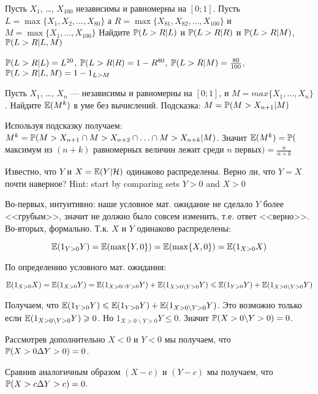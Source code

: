 \begin{problem}
Пусть $ X_{1} $, \ldots, $ X_{100} $ независимы и равномерны на $ [0;1] $. Пусть $ L=\max\{X_{1},X_{2},\ldots, X_{80}\} $ а $ R=\max\{X_{81},X_{82},\ldots,X_{100}\} $ и $ M=\max\{X_{1},\ldots,X_{100}\} $ Найдите $ \P(L>R|L)$ и $ \P(L>R|R) $ и $ \P(L>R|M)$, $\P(L>R|L,M) $
\end{problem} 
\begin{solution} 
$ \P(L>R|L)=L^{20}$,  $ \P(L>R|R)=1-R^{80} $, $ \P(L>R|M)=\frac{80}{100}$, $\P(L>R|L,M)=1-1_{L>M} $  
\end{solution}

\begin{problem}
Пусть $ X_{1} $, \ldots, $ X_{n} $ --- независимы и равномерны на $ [0;1] $, и $ M=max\{X_{1},\ldots,X_{n}\} $. Найдите $\E(M^{k})$ в уме без вычислений. Подсказка: $ M=\P(M>X_{n+1}|M) $

\end{problem} 
\begin{solution} 
Используя подсказку получаем: $ M^{k}=\P(M>X_{n+1} \cap M>X_{n+2} \cap \ldots \cap M>X_{n+k}|M) $. Значит $ \E(M^{k})=\P($максимум из $ (n+k) $ равномерных величин лежит среди $ n $ первых$)=\frac{n}{n+k} $
\end{solution}

\begin{problem}
Известно, что $ Y $ и $ X=\E(Y|\mathcal{H}) $ одинаково распределены. Верно ли, что $ Y=X $ почти наверное? Hint: start by comparing sets $ Y>0 $ and $ X>0 $
\end{problem} 
\begin{solution} 
Во-первых, интуитивно: наше условное мат. ожидание не сделало $ Y $ более <<грубым>>, значит не должно было совсем изменить, т.е. ответ <<верно>>. Во-вторых, формально. Т.к. $ X $ и $ Y $ одинаково распределены:

\[ \E(1_{Y>0}Y)=\E(\max\{Y,0\})=\E(\max\{X,0\})=\E(1_{X>0}X) \]

По определению условного мат. ожидания:

\[ \E(1_{X>0}X)=\E(1_{X>0}Y)=\E(1_{X>0\cap Y>0} Y)+\E(1_{X>0\backslash Y>0} Y)\leq \E(1_{ Y>0} Y)+\E(1_{X>0\backslash Y>0} Y)\]

Получаем, что $ \E(1_{Y>0}Y) \leq \E(1_{ Y>0} Y)+\E(1_{X>0\backslash Y>0} Y) $. Это возможно только если $ \E(1_{X>0\backslash Y>0} Y)\geq 0 $. Но $ 1_{X>0\backslash Y>0} Y \leq 0$. Значит $ \P(X>0 \backslash Y>0)=0 $.

Рассмотрев дополнительно $ X<0 $ и $ Y<0 $ мы получаем, что $ \P(X>0 \Delta Y>0)=0 $.

Сравнив аналогичным образом $ (X-c) $ и $ (Y-c) $ мы получаем, что $ \P(X>c \Delta Y>c)=0 $.


\end{solution}

